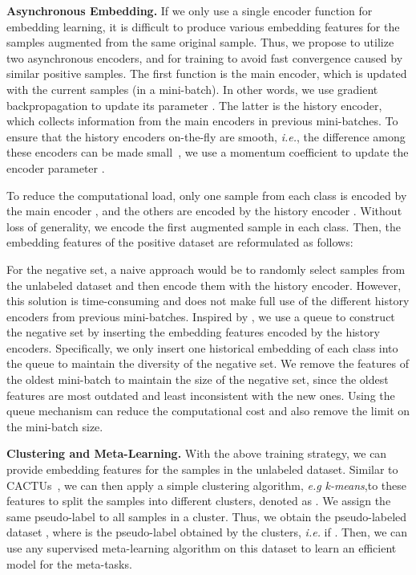 \documentclass[runningheads]{llncs}
\begin{document}
\noindent\textbf{Asynchronous Embedding.} If we only use a single encoder function  for embedding learning, it is difficult to produce various embedding features for the samples augmented from the same original sample. Thus, we propose to utilize two asynchronous encoders,  and  for training to avoid fast convergence caused by similar positive samples. The first function  is the main encoder, which is updated with the current samples (in a mini-batch). In other words, we use gradient backpropagation to update its parameter . The latter  is the history encoder, which collects information from the main encoders in previous mini-batches. To ensure that the history encoders on-the-fly are smooth, \emph{i.e.}, the difference among these encoders can be made small~\cite{he2019momentum}, we use a momentum coefficient  to update the encoder parameter .


To reduce the computational load, only one sample from each class is encoded by the main encoder , and the others are encoded by the history encoder . Without loss of generality, we encode the first augmented sample in each class. Then, the embedding features of the positive dataset  are reformulated as follows:


For the negative set, a naive approach would be to randomly select samples from the unlabeled dataset and then encode them with the history encoder. However, this solution is time-consuming and does not make full use of the different history encoders from previous mini-batches. Inspired by \cite{he2019momentum}, we use a queue to construct the negative set by inserting the embedding features encoded by the history encoders. Specifically, we only insert one historical embedding of each class into the queue to maintain the diversity of the negative set. We remove the features of the oldest mini-batch to maintain the size of the negative set, since the oldest features are most outdated and least inconsistent with the new ones. Using the queue mechanism can reduce the computational cost and also remove the limit on the mini-batch size. 

\noindent\textbf{Clustering and Meta-Learning.} With the above training strategy, we can provide embedding features for the samples in the unlabeled dataset. Similar to CACTUs~\cite{hsu2018unsupervised}, we can then apply a simple clustering algorithm, \emph{e.g} \textit{k-means},to these features to split the samples into different clusters, denoted as . We assign the same pseudo-label to all samples in a cluster. Thus, we obtain the pseudo-labeled dataset , where  is the pseudo-label obtained by the clusters, \emph{i.e.}  if . Then, we can use any supervised meta-learning algorithm on this dataset to learn an efficient model for the meta-tasks.  
\end{document}

